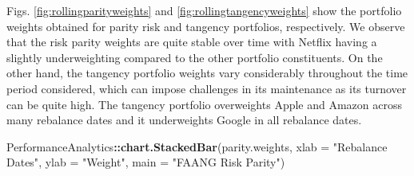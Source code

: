 \documentclass[]{book}
\newenvironment{Shaded}{\begin{snugshade}}{\end{snugshade}}
\newcommand{\KeywordTok}[1]{\textcolor[rgb]{0.13,0.29,0.53}{\textbf{#1}}}
\newcommand{\DataTypeTok}[1]{\textcolor[rgb]{0.13,0.29,0.53}{#1}}
\newcommand{\StringTok}[1]{\textcolor[rgb]{0.31,0.60,0.02}{#1}}
\newcommand{\OperatorTok}[1]{\textcolor[rgb]{0.81,0.36,0.00}{\textbf{#1}}}
\newcommand{\NormalTok}[1]{#1}
\theoremstyle{definition}
\theoremstyle{definition}
\theoremstyle{definition}
\theoremstyle{remark}
\begin{document}
\begin{Shaded}
\end{Shaded}

Figs. \ref{fig:rollingparityweights} and
\ref{fig:rollingtangencyweights} show the portfolio weights obtained for
parity risk and tangency portfolios, respectively. We observe that the
risk parity weights are quite stable over time with Netflix having a
slightly underweighting compared to the other portfolio constituents. On
the other hand, the tangency portfolio weights vary considerably
throughout the time period considered, which can impose challenges in
its maintenance as its turnover can be quite high. The tangency
portfolio overweights Apple and Amazon across many rebalance dates and
it underweights Google in all rebalance dates.

\begin{Shaded}
\begin{Highlighting}[]
\NormalTok{PerformanceAnalytics}\OperatorTok{::}\KeywordTok{chart.StackedBar}\NormalTok{(parity.weights, }\DataTypeTok{xlab =} \StringTok{"Rebalance Dates"}\NormalTok{, }
  \DataTypeTok{ylab =} \StringTok{"Weight"}\NormalTok{, }\DataTypeTok{main =} \StringTok{"FAANG Risk Parity"}\NormalTok{)}
\end{Highlighting}
\end{Shaded}
\end{document}
